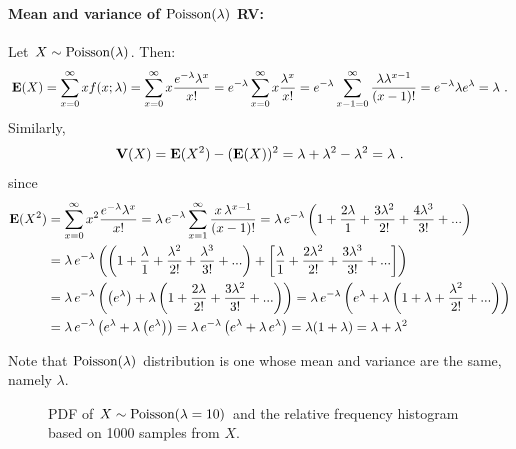 \paragraph{Mean and variance of $\mbox{{\rm Poisson}}(\lambda)$ RV:}
Let $X \sim \mbox{{\rm Poisson}}(\lambda)$.  Then:
\[
\mathbf{E}(X) = \sum_{x=0}^{\infty} x f(x;\lambda)
= \sum_{x =0}^{\infty} x \frac{ e^{-\lambda} \lambda^x}{x!}
= e^{-\lambda} \sum_{x =0}^{\infty} x \frac{  \lambda^x}{x!}
= e^{-\lambda} \sum_{x -1 =0}^{\infty} \frac{ \lambda \lambda^{x-1}}{(x-1)!}
= e^{-\lambda} \lambda e^{\lambda}
= \lambda
\ .
\]
Similarly,
\[
\V(X) = \e(X^2)-(\e(X))^2 = \lambda + \lambda^2 - \lambda^2 = \lambda \ .
\]
since
\begin{align*}
\mathbf{E}(X^2)& = \sum_{x=0}^{\infty} x^2 \frac{e^{-\lambda} \lambda^x}{x!} = \lambda \, e^{-\lambda} \sum_{x=1}^{\infty} \frac{x \, \lambda^{x-1}}{(x-1)!}
= \lambda \, e^{-\lambda} \left( 1 + \frac{2 \lambda}{1} + \frac{3 \lambda^2}{2!} + \frac{4 \lambda^3}{3!} + ... \right)\\
&= \lambda \, e^{-\lambda} \left( \left( 1 + \frac{\lambda}{1} + \frac{\lambda^2}{2!} + \frac{\lambda^3}{3!} + ... \right) + \left[ \frac{\lambda}{1} + \frac{2 \lambda^2}{2!} + \frac{3 \lambda^3}{3!} + ... \right] \right)\\
&= \lambda \, e^{-\lambda} \left( \left( e^{\lambda} \right) + \lambda \left( 1 + \frac{2 \lambda}{2!} + \frac{3 \lambda^2}{3!} + ... \right) \right)
= \lambda \, e^{-\lambda} \left( e^{\lambda} + \lambda \left( 1 + \lambda + \frac{\lambda^2}{2!} + ... \right) \right)\\
&= \lambda \, e^{-\lambda} \left( e^{\lambda} + \lambda \left( e^{\lambda} \right) \right)
= \lambda \, e^{-\lambda} \left( e^{\lambda} + \lambda\, e^{\lambda}\right) = \lambda (1 + \lambda) = \lambda + \lambda^2
\end{align*}

Note that $\mbox{{\rm Poisson}}(\lambda)$ distribution is one whose mean and variance are the same, namely $\lambda$.

\begin{figure}[htpb]
\caption{PDF of $X \sim \mbox{{\rm Poisson}}(\lambda=10)$ and the relative frequency histogram based on 1000 samples from $X$.\label{F:PlotPdfSim1000HistPoiss10}}
\centering   {}
\end{figure}

